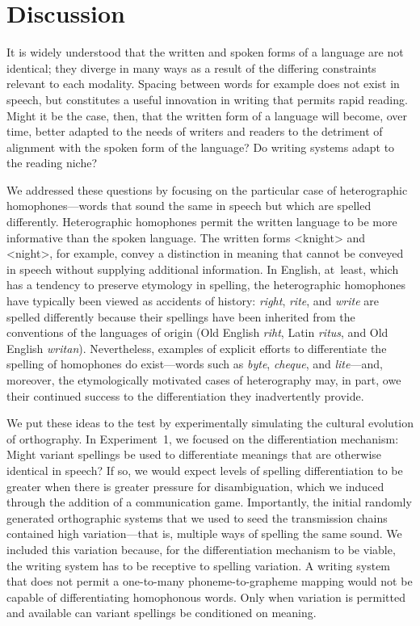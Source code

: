 \documentclass[doc,biblatex]{apa7}
\begin{document}

\section{Discussion}

It is widely understood that the written and spoken forms of a language are not identical; they diverge in many ways as a result of the differing constraints relevant to each modality. Spacing between words for example does not exist in speech, but constitutes a useful innovation in writing that permits rapid reading. Might it be the case, then, that the written form of a language will become, over time, better adapted to the needs of writers and readers to the detriment of alignment with the spoken form of the language? Do writing systems adapt to the reading niche?

We addressed these questions by focusing on the particular case of heterographic homophones---words that sound the same in speech but which are spelled differently. Heterographic homophones permit the written language to be more informative than the spoken language. The written forms <knight> and <night>, for example, convey a distinction in meaning that cannot be conveyed in speech without supplying additional information. In English, at~least, which has a tendency to preserve etymology in spelling, the heterographic homophones have typically been viewed as accidents of history: \textit{right}, \textit{rite}, and \textit{write} are spelled differently because their spellings have been inherited from the conventions of the languages of origin (Old English \textit{riht}, Latin \textit{ritus}, and Old English \textit{writan}). Nevertheless, examples of explicit efforts to differentiate the spelling of homophones do exist---words such as \textit{byte}, \textit{cheque}, and \textit{lite}---and, moreover, the etymologically motivated cases of heterography may, in part, owe their continued success to the differentiation they inadvertently provide.

We put these ideas to the test by experimentally simulating the cultural evolution of orthography. In Experiment~1, we focused on the differentiation mechanism: Might variant spellings be used to differentiate meanings that are otherwise identical in speech? If so, we would expect levels of spelling differentiation to be greater when there is greater pressure for disambiguation, which we induced through the addition of a communication game. Importantly, the initial randomly generated orthographic systems that we used to seed the transmission chains contained high variation---that is, multiple ways of spelling the same sound. We included this variation because, for the differentiation mechanism to be viable, the writing system has to be receptive to spelling variation. A writing system that does not permit a one-to-many phoneme-to-grapheme mapping would not be capable of differentiating homophonous words. Only when variation is permitted and available can variant spellings be conditioned on meaning.
\end{document}

